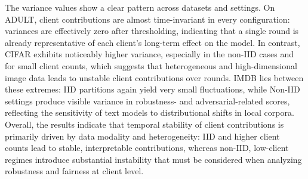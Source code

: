 \documentclass{uai2026}
\begin{document}
The variance values show a clear pattern across datasets and settings. On ADULT, client contributions are almost time-invariant in every configuration: variances are effectively zero after thresholding, indicating that a single round is already representative of each client’s long-term effect on the model. In contrast, CIFAR exhibits noticeably higher variance, especially in the non-IID cases and for small client counts, which suggests that heterogeneous and high-dimensional image data leads to unstable client contributions over rounds. IMDB lies between these extremes: IID partitions again yield very small fluctuations, while Non-IID settings produce visible variance in robustness- and adversarial-related scores, reflecting the sensitivity of text models to distributional shifts in local corpora. Overall, the results indicate that temporal stability of client contributions is primarily driven by data modality and heterogeneity: IID and higher client counts lead to stable, interpretable contributions, whereas non-IID, low-client regimes introduce substantial instability that must be considered when analyzing robustness and fairness at client level.
\end{document}
